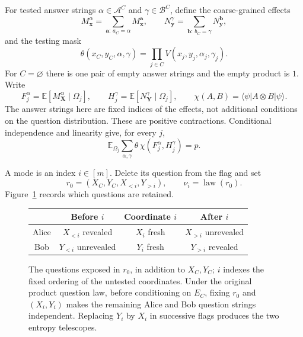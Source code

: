 For tested answer strings $\alpha\in\mathcal A^C$ and
$\gamma\in\mathcal B^C$, define the coarse-grained effects
\[
 M_{\mathbf x}^{\alpha}
   =\sum_{\mathbf a:\,a_C=\alpha}M_{\mathbf x}^{\mathbf a},
 \qquad
 N_{\mathbf y}^{\gamma}
   =\sum_{\mathbf b:\,b_C=\gamma}N_{\mathbf y}^{\mathbf b},
\]
and the testing mask
\[
 \theta(x_C,y_C,\alpha,\gamma)
   =\prod_{j\in C}V(x_j,y_j,\alpha_j,\gamma_j).
\]
For $C=\varnothing$ there is one pair of empty answer strings and the
empty product is $1$. Write
\[
 F_j^\alpha=\mathbb E[M_{\mathbf X}^\alpha\mid\Omega_j],\qquad
 H_j^\gamma=\mathbb E[N_{\mathbf Y}^\gamma\mid\Omega_j],\qquad
 \chi(A,B)=\langle\psi|A\otimes B|\psi\rangle.
\]
The answer strings here are fixed indices of the effects, not additional
conditions on the question distribution. These are positive contractions.
Conditional independence and linearity
give, for every $j$,
\begin{equation}\label{eq:exposure-mass}
 \mathbb E_{\Omega_j}\sum_{\alpha,\gamma}
       \theta\,\chi(F_j^\alpha,H_j^\gamma)=p.
\end{equation}

A mode is an index $i\in[m]$. Delete its question from the flag and set
\[
 r_0=(X_C,Y_C,X_{<i},Y_{>i}),\qquad \nu_i=\operatorname{law}(r_0).
\]
Figure~\ref{fig:exposure} records which questions are retained.
\begin{figure}[!h]
\centering
\begin{tabular}{c@{\qquad}ccc}
\toprule
 & Before $i$ & Coordinate $i$ & After $i$\\
\midrule
Alice & $X_{<i}$ revealed & $X_i$ fresh & $X_{>i}$ unrevealed\\
Bob   & $Y_{<i}$ unrevealed & $Y_i$ fresh & $Y_{>i}$ revealed\\
\bottomrule
\end{tabular}
\caption{The questions exposed in $r_0$, in addition to $X_C,Y_C$;
$i$ indexes the fixed ordering of the untested coordinates. Under the
original product question law, before conditioning on $E_C$, fixing
$r_0$ and $(X_i,Y_i)$ makes the remaining Alice and Bob question strings
independent. Replacing $Y_i$ by $X_i$ in successive flags produces the
two entropy telescopes.}
\label{fig:exposure}
\end{figure}


